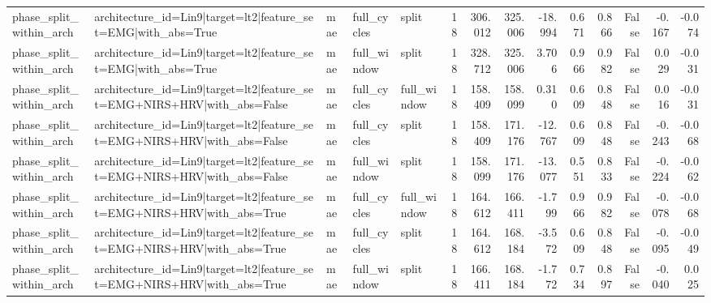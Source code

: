 \begin{table}
\begin{tabular}{lllllrrrrrrrrr}
phase_split_within_arch & architecture_id=Lin9|target=lt2|feature_set=EMG|with_abs=True & mae & full_cycles & split & 18 & 306.012 & 325.006 & -18.994 & 0.671 & 0.866 & False & -0.167 & -0.074 \\
phase_split_within_arch & architecture_id=Lin9|target=lt2|feature_set=EMG|with_abs=True & mae & full_window & split & 18 & 328.712 & 325.006 & 3.706 & 0.966 & 0.982 & False & 0.029 & -0.031 \\
phase_split_within_arch & architecture_id=Lin9|target=lt2|feature_set=EMG+NIRS+HRV|with_abs=False & mae & full_cycles & full_window & 18 & 158.409 & 158.099 & 0.310 & 0.609 & 0.848 & False & 0.016 & -0.031 \\
phase_split_within_arch & architecture_id=Lin9|target=lt2|feature_set=EMG+NIRS+HRV|with_abs=False & mae & full_cycles & split & 18 & 158.409 & 171.176 & -12.767 & 0.609 & 0.848 & False & -0.243 & -0.068 \\
phase_split_within_arch & architecture_id=Lin9|target=lt2|feature_set=EMG+NIRS+HRV|with_abs=False & mae & full_window & split & 18 & 158.099 & 171.176 & -13.077 & 0.551 & 0.833 & False & -0.224 & -0.062 \\
phase_split_within_arch & architecture_id=Lin9|target=lt2|feature_set=EMG+NIRS+HRV|with_abs=True & mae & full_cycles & full_window & 18 & 164.612 & 166.411 & -1.799 & 0.966 & 0.982 & False & -0.078 & -0.068 \\
phase_split_within_arch & architecture_id=Lin9|target=lt2|feature_set=EMG+NIRS+HRV|with_abs=True & mae & full_cycles & split & 18 & 164.612 & 168.184 & -3.572 & 0.609 & 0.848 & False & -0.095 & -0.049 \\
phase_split_within_arch & architecture_id=Lin9|target=lt2|feature_set=EMG+NIRS+HRV|with_abs=True & mae & full_window & split & 18 & 166.411 & 168.184 & -1.772 & 0.734 & 0.897 & False & -0.040 & 0.025 \\
\bottomrule
\end{tabular}
\end{table}
